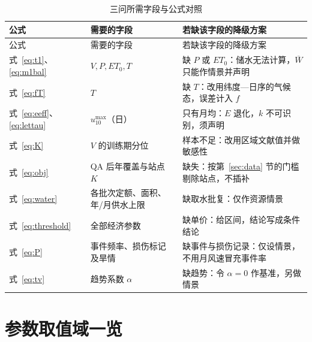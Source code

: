 \documentclass[11pt,a4paper]{ctexart}
\begin{document}
\begin{longtable}{|p{3.7cm}|p{4.7cm}|p{6.0cm}|}
\caption{三问所需字段与公式对照}\label{tab:fieldmap}\\
\hline
公式 & 需要的字段 & 若缺该字段的降级方案 \\
\hline
\endfirsthead
\hline
公式 & 需要的字段 & 若缺该字段的降级方案 \\
\hline
\endhead
式~\eqref{eq:t1}、\eqref{eq:m1bal} & $V,P,ET_0,T$ & 缺 $P$ 或 $ET_0$：储水无法计算，$\overline W$ 只能作情景并声明 \\
式~\eqref{eq:fT} & $T$ & 缺 $T$：改用纬度—日序的气候态，误差计入 $f$ \\
式~\eqref{eq:eeff}、\eqref{eq:lettau} & $u_{10}^{\max}$（日） & 只有月均：$E$ 退化，$k$ 不可识别，须声明 \\
式~\eqref{eq:K} & $V$ 的训练期分位 & 样本不足：改用区域文献值并做敏感性 \\
式~\eqref{eq:obj} & QA 后年覆盖与站点 $K$ & 缺失：按第~\ref{sec:data} 节的门槛剔除站点，不插补 \\
式~\eqref{eq:water} & 各批次定额、面积、年/月供水上限 & 缺取水批复：仅作资源情景 \\
式~\eqref{eq:threshold} & 全部经济参数 & 缺单价：给区间，结论写成条件结论 \\
式~\eqref{eq:P} & 事件频率、损伤标记及旱情 & 缺事件与损伤记录：仅设情景，不用月风速冒充事件率 \\
式~\eqref{eq:tv} & 趋势系数 $\alpha$ & 缺趋势：令 $\alpha=0$ 作基准，另做情景 \\
\hline
\end{longtable}

\section{参数取值域一览}\label{app:par}
\end{document}
